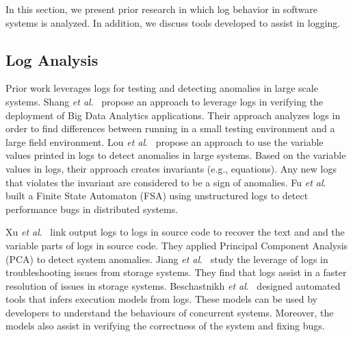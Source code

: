 
In this section, we present prior research in which log behavior in software systems is analyzed. In addition, we discuss tools developed to assist in logging. 


\subsection{Log Analysis}

Prior work leverages logs for testing and detecting anomalies in large scale systems. Shang\textsl{ et al$.$}~\cite{IanContextinformation} propose an approach to leverage logs in verifying the deployment of Big Data Analytics applications. Their approach analyzes logs in order to find differences between running in a small testing environment and a large field environment. Lou \textsl{et al}$.$~\cite{JGLouMining} propose an approach to use the variable values printed in logs to detect anomalies in large systems. Based on the variable values in logs, their approach creates invariants (e.g., equations). Any new logs that violates the invariant are considered to be a sign of anomalies. Fu \textsl{et al}$ . $~\cite{QFuanomaly} built a Finite State Automaton (FSA) using unstructured logs to detect performance bugs in distributed systems. 

\indent Xu \textsl{et al}$ . $~\cite{ConsoleLogs} link output logs to logs in source code to recover the text and and the variable parts of logs in source code. They applied Principal Component Analysis (PCA) to detect system anomalies. Jiang \textsl{et al}$ . $~\cite{Jiang:2009:UCP:1525908.1525912} study the leverage of logs in troubleshooting issues from storage systems. They find that logs assist in a faster resolution of issues in storage systems. Beschastnikh \textsl{et al}$ . $~\cite{Beschastnikh:2011:LEI:2025113.2025151} designed automated tools that infers execution models from logs. These models can be used by developers to understand the behaviours of concurrent systems. Moreover, the models also assist in verifying the correctness of the system and fixing bugs.

